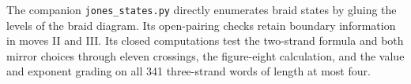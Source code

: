 The companion \texttt{jones\_states.py} directly enumerates braid states by
gluing the levels of the braid diagram. Its open-pairing checks retain
boundary information in moves II and III. Its closed computations test the
two-strand formula and both mirror choices through eleven crossings, the
figure-eight calculation, and the value and exponent grading on all 341
three-strand words of length at most four.
